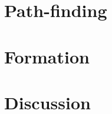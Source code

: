 \documentclass[a4paper]{article}
\begin{document}
 \section{Path-finding}
  
 
 \section{Formation}
  

\section{Discussion}
  




\end{document}
